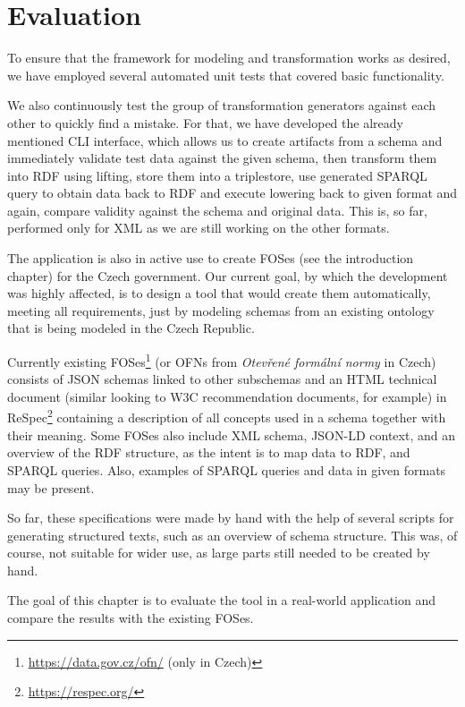 \chapter{Evaluation}
\label{chapters:evaluation}

To ensure that the framework for modeling and transformation works as desired, we have employed several automated unit tests that covered basic functionality.

We also continuously test the group of transformation generators against each other to quickly find a mistake. For that, we have developed the already mentioned CLI interface, which allows us to create artifacts from a schema and immediately validate test data against the given schema, then transform them into RDF using lifting, store them into a triplestore, use generated SPARQL query to obtain data back to RDF and execute lowering back to given format and again, compare validity against the schema and original data. This is, so far, performed only for XML as we are still working on the other formats.

\medskip

The application is also in active use to create FOSes (see the introduction chapter) for the Czech government. Our current goal, by which the development was highly affected, is to design a tool that would create them automatically, meeting all requirements, just by modeling schemas from an existing ontology that is being modeled \cite{kvremen2019improving} in the Czech Republic.

Currently existing FOSes\footnote{\url{https://data.gov.cz/ofn/} (only in Czech)} (or OFNs from \textit{Otevřené formální normy} in Czech) consists of JSON schemas linked to other subschemas and an HTML technical document (similar looking to W3C recommendation documents, for example) in ReSpec\footnote{\url{https://respec.org/}} containing a description of all concepts used in a schema together with their meaning. Some FOSes also include XML schema, JSON-LD context, and an overview of the RDF structure, as the intent is to map data to RDF, and SPARQL queries. Also, examples of SPARQL queries and data in given formats may be present.

So far, these specifications were made by hand with the help of several scripts for generating structured texts, such as an overview of schema structure. This was, of course, not suitable for wider use, as large parts still needed to be created by hand.

The goal of this chapter is to evaluate the tool in a real-world application and compare the results with the existing FOSes.

